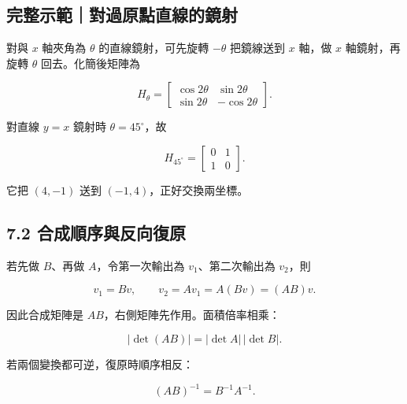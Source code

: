 \documentclass[11pt,a4paper]{article}
\begin{document}
\begin{HandoutWorkedExample}

\subsection{完整示範｜對過原點直線的鏡射}\label{ux5b8cux6574ux793aux7bc4ux5c0dux904eux539fux9edeux76f4ux7ddaux7684ux93e1ux5c04}

對與 \(x\) 軸夾角為 \(\theta\) 的直線鏡射，可先旋轉 \(-\theta\) 把鏡線送到 \(x\) 軸，做 \(x\) 軸鏡射，再旋轉 \(\theta\) 回去。化簡後矩陣為

\[
H_\theta=
\begin{bmatrix}
\cos2\theta&\sin2\theta\\
\sin2\theta&-\cos2\theta
\end{bmatrix}.
\]

對直線 \(y=x\) 鏡射時 \(\theta=45^\circ\)，故

\[
H_{45^\circ}
=\begin{bmatrix}0&1\\1&0\end{bmatrix}.
\]

它把 \((4,-1)\) 送到 \(\boxed{(-1,4)}\)，正好交換兩坐標。

\end{HandoutWorkedExample}

\subsection{7.2 合成順序與反向復原}\label{ux5408ux6210ux9806ux5e8fux8207ux53cdux5411ux5fa9ux539f}

若先做 \(B\)、再做 \(A\)，令第一次輸出為 \(v_1\)、第二次輸出為 \(v_2\)，則

\[
v_1=Bv,\qquad v_2=Av_1=A(Bv)=(AB)v.
\]

因此合成矩陣是 \(AB\)，右側矩陣先作用。面積倍率相乘：

\[
|\det(AB)|=|\det A|\,|\det B|.
\]

若兩個變換都可逆，復原時順序相反：

\[
(AB)^{-1}=B^{-1}A^{-1}.
\]

\clearpage
\end{document}
